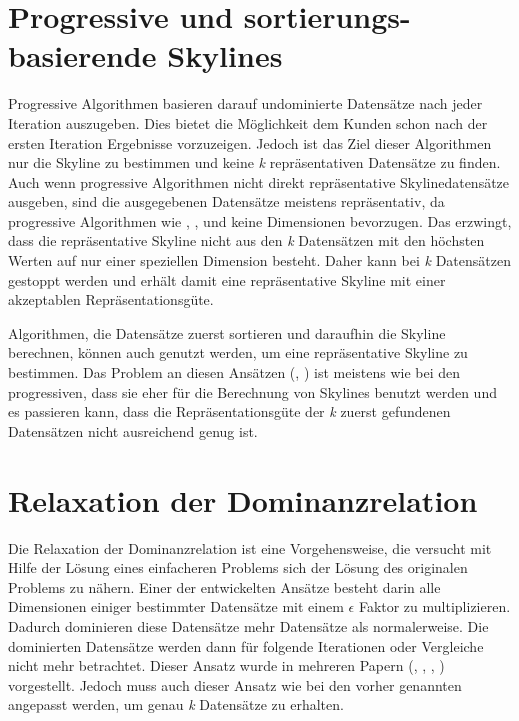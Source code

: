\section{Progressive und sortierungs-basierende Skylines}
\label{ch:Forschungsstand:sec:progSortSky}
Progressive Algorithmen basieren darauf undominierte Datensätze nach jeder Iteration auszugeben. Dies bietet die Möglichkeit dem Kunden schon nach der ersten Iteration Ergebnisse vorzuzeigen. Jedoch ist das Ziel dieser Algorithmen nur die Skyline zu bestimmen und keine \textit{k} repräsentativen Datensätze zu finden.
Auch wenn progressive Algorithmen nicht direkt repräsentative Skylinedatensätze ausgeben, sind die ausgegebenen Datensätze meistens repräsentativ, da progressive Algorithmen wie \cite{Tan:2001:EPS:645927.672217}, \cite{papadias2005progressive}, \cite{Kossmann:2002:SSS:1287369.1287394} und \cite{Papadias:2003:OPA:872757.872814} keine Dimensionen bevorzugen. Das erzwingt, dass die repräsentative Skyline nicht aus den \textit{k} Datensätzen mit den höchsten Werten auf nur einer speziellen Dimension besteht. Daher kann bei \textit{k} Datensätzen gestoppt werden und erhält damit eine repräsentative Skyline mit einer akzeptablen Repräsentationsgüte.

Algorithmen, die Datensätze zuerst sortieren und daraufhin die Skyline berechnen, können auch genutzt werden, um eine repräsentative Skyline zu bestimmen. Das Problem an diesen Ansätzen (\cite{1260846}, \cite{lee2010z}) ist meistens wie bei den progressiven, dass sie eher für die Berechnung von Skylines benutzt werden und es passieren kann, dass die Repräsentationsgüte der \textit{k} zuerst gefundenen Datensätzen nicht ausreichend genug ist.
\section{Relaxation der Dominanzrelation}
\label{ch:Forschungsstand:sec:relaxDomRel}
Die Relaxation der Dominanzrelation ist eine Vorgehensweise, die versucht mit Hilfe der Lösung eines einfacheren Problems sich der Lösung des originalen Problems zu nähern. 
Einer der entwickelten Ansätze besteht darin alle Dimensionen einiger bestimmter Datensätze mit einem $\epsilon$ Faktor zu multiplizieren. Dadurch dominieren diese Datensätze mehr Datensätze als normalerweise. Die dominierten Datensätze werden dann für folgende Iterationen oder Vergleiche nicht mehr betrachtet. Dieser Ansatz wurde in mehreren Papern (\cite{Koltun05approximatelydominating}, \cite{Su:2007:AMA:1418332.1418454}, \cite{Vassilvitskii:2005:ECS:1132633.1132648}, \cite{Xia:2008:SFD:1546682.1547149}) vorgestellt. Jedoch muss auch dieser Ansatz wie bei den vorher genannten angepasst werden, um genau \textit{k} Datensätze zu erhalten.

